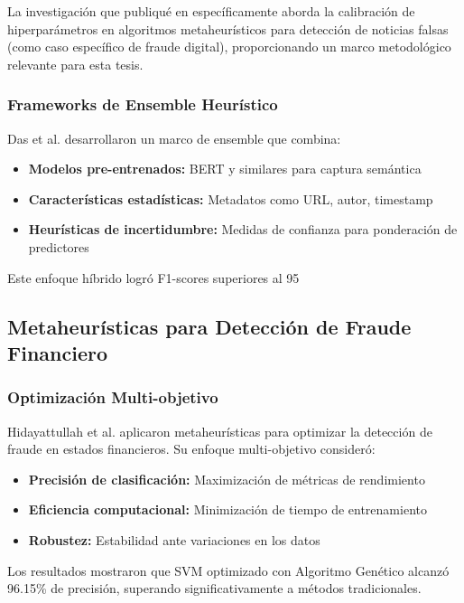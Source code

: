 La investigación que publiqué en \cite{hurtado2024calibracion} específicamente aborda la calibración de hiperparámetros en algoritmos metaheurísticos para detección de noticias falsas (como caso específico de fraude digital), proporcionando un marco metodológico relevante para esta tesis.

\subsubsection{Frameworks de Ensemble Heurístico}

Das et al. \cite{das2022heuristic} desarrollaron un marco de ensemble que combina:
\begin{itemize}
    \item \textbf{Modelos pre-entrenados:} BERT y similares para captura semántica
    \item \textbf{Características estadísticas:} Metadatos como URL, autor, timestamp
    \item \textbf{Heurísticas de incertidumbre:} Medidas de confianza para ponderación de predictores
\end{itemize}

Este enfoque híbrido logró F1-scores superiores al 95%

\subsection{Metaheurísticas para Detección de Fraude Financiero}

\subsubsection{Optimización Multi-objetivo}

Hidayattullah et al. \cite{hidayattullah2020financial} aplicaron metaheurísticas para optimizar la detección de fraude en estados financieros. Su enfoque multi-objetivo consideró:
\begin{itemize}
    \item \textbf{Precisión de clasificación:} Maximización de métricas de rendimiento
    \item \textbf{Eficiencia computacional:} Minimización de tiempo de entrenamiento
    \item \textbf{Robustez:} Estabilidad ante variaciones en los datos
\end{itemize}

Los resultados mostraron que SVM optimizado con Algoritmo Genético alcanzó 96.15\% de precisión, superando significativamente a métodos tradicionales.

